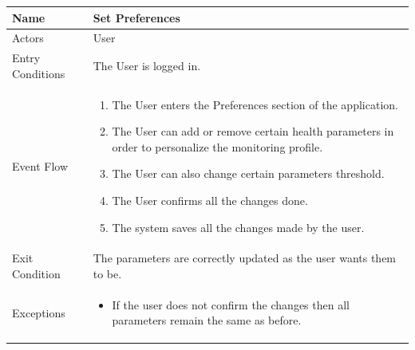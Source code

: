 \begin{enumerate}
\FloatBarrier
\begin{table}[h]
\begin{tabular}{|l|p{}|}
\hline
Name             & Set Preferences \\ \hline
Actors           & User  \\ \hline
Entry Conditions & The User is logged in. \\ \hline
Event Flow       & \begin{enumerate}
            \item The User enters the Preferences section of the application.
            \item The User can add or remove certain health parameters in order to personalize the monitoring profile.
            \item The User can also change certain parameters threshold.
            \item The User confirms all the changes done.
            \item The system saves all the changes made by the user.
        \end{enumerate}\\ \hline
Exit Condition   & The parameters are correctly updated as the user wants them to be.\\ \hline
Exceptions       & \begin{itemize}
\item If the user does not confirm the changes then all parameters remain the same as before. 
\end{itemize} \\ \hline
\end{tabular}
\end{table}
\FloatBarrier


\end{enumerate}
